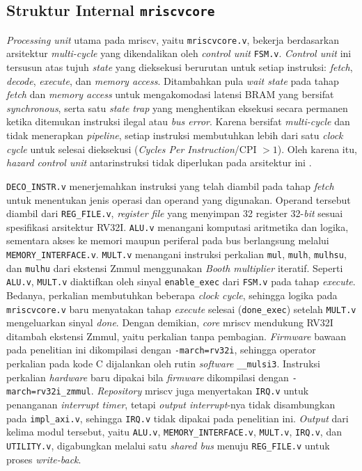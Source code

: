 \subsection{Struktur Internal \texttt{mriscvcore}}
\label{subsec:struktur-internal-mriscvcore}

\textit{Processing unit} utama pada mriscv, yaitu \texttt{mriscvcore.v}, bekerja berdasarkan arsitektur \textit{multi-cycle} yang dikendalikan oleh \textit{control unit} \texttt{FSM.v}. \textit{Control unit} ini tersusun atas tujuh \textit{state} yang dieksekusi berurutan untuk setiap instruksi: \textit{fetch}, \textit{decode}, \textit{execute}, dan \textit{memory access}. Ditambahkan pula \textit{wait state} pada tahap \textit{fetch} dan \textit{memory access} untuk mengakomodasi latensi BRAM yang bersifat \textit{synchronous}, serta satu \textit{state} \textit{trap} yang menghentikan eksekusi secara permanen ketika ditemukan instruksi ilegal atau \textit{bus error}. Karena bersifat \textit{multi-cycle} dan tidak menerapkan \textit{pipeline}, setiap instruksi membutuhkan lebih dari satu \textit{clock cycle} untuk selesai dieksekusi (\textit{Cycles Per Instruction}/CPI $>1$). Oleh karena itu, \textit{hazard control unit} antarinstruksi tidak diperlukan pada arsitektur ini \cite{harris2021digital, solovev2021asmd}.

\texttt{DECO\_INSTR.v} menerjemahkan instruksi yang telah diambil pada tahap \textit{fetch} untuk menentukan jenis operasi dan operand yang digunakan. Operand tersebut diambil dari \texttt{REG\_FILE.v}, \textit{register file} yang menyimpan 32 register 32-\textit{bit} sesuai spesifikasi arsitektur RV32I. \texttt{ALU.v} menangani komputasi aritmetika dan logika, sementara akses ke memori maupun periferal pada bus berlangsung melalui \texttt{MEMORY\_INTERFACE.v}. \texttt{MULT.v} menangani instruksi perkalian \texttt{mul}, \texttt{mulh}, \texttt{mulhsu}, dan \texttt{mulhu} dari ekstensi Zmmul menggunakan \textit{Booth multiplier} iteratif. Seperti \texttt{ALU.v}, \texttt{MULT.v} diaktifkan oleh sinyal \texttt{enable\_exec} dari \texttt{FSM.v} pada tahap \textit{execute}. Bedanya, perkalian membutuhkan beberapa \textit{clock cycle}, sehingga logika pada \texttt{mriscvcore.v} baru menyatakan tahap \textit{execute} selesai (\texttt{done\_exec}) setelah \texttt{MULT.v} mengeluarkan sinyal \textit{done}. Dengan demikian, \textit{core} mriscv mendukung RV32I ditambah ekstensi Zmmul, yaitu perkalian tanpa pembagian. \textit{Firmware} bawaan pada penelitian ini dikompilasi dengan \texttt{-march=rv32i}, sehingga operator perkalian pada kode C dijalankan oleh rutin \textit{software} \texttt{\_\_mulsi3}. Instruksi perkalian \textit{hardware} baru dipakai bila \textit{firmware} dikompilasi dengan \texttt{-march=rv32i\_zmmul}. \textit{Repository} mriscv juga menyertakan \texttt{IRQ.v} untuk penanganan \textit{interrupt timer}, tetapi \textit{output interrupt}-nya tidak disambungkan pada \texttt{impl\_axi.v}, sehingga \texttt{IRQ.v} tidak dipakai pada penelitian ini. \textit{Output} dari kelima modul tersebut, yaitu \texttt{ALU.v}, \texttt{MEMORY\_INTERFACE.v}, \texttt{MULT.v}, \texttt{IRQ.v}, dan \texttt{UTILITY.v}, digabungkan melalui satu \textit{shared bus} menuju \texttt{REG\_FILE.v} untuk proses \textit{write-back}.

